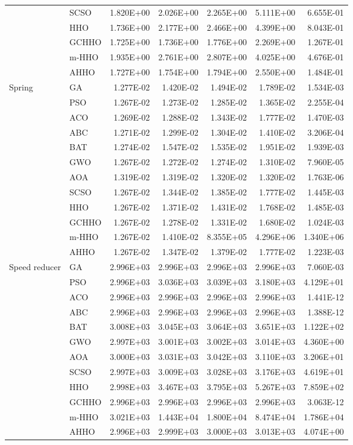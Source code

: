 \begin{longtable}{llrrrrr}
 & SCSO & 1.820E+00 & 2.026E+00 & 2.265E+00 & 5.111E+00 & 6.655E-01 \\
 & HHO & 1.736E+00 & 2.177E+00 & 2.466E+00 & 4.399E+00 & 8.043E-01 \\
 & GCHHO & 1.725E+00 & 1.736E+00 & 1.776E+00 & 2.269E+00 & 1.267E-01 \\
 & m-HHO & 1.935E+00 & 2.761E+00 & 2.807E+00 & 4.025E+00 & 4.676E-01 \\
 & AHHO & 1.727E+00 & 1.754E+00 & 1.794E+00 & 2.550E+00 & 1.484E-01 \\
\addlinespace
Spring & GA & 1.277E-02 & 1.420E-02 & 1.494E-02 & 1.789E-02 & 1.534E-03 \\
 & PSO & 1.267E-02 & 1.273E-02 & 1.285E-02 & 1.365E-02 & 2.255E-04 \\
 & ACO & 1.269E-02 & 1.288E-02 & 1.343E-02 & 1.777E-02 & 1.470E-03 \\
 & ABC & 1.271E-02 & 1.299E-02 & 1.304E-02 & 1.410E-02 & 3.206E-04 \\
 & BAT & 1.274E-02 & 1.547E-02 & 1.535E-02 & 1.951E-02 & 1.939E-03 \\
 & GWO & 1.267E-02 & 1.272E-02 & 1.274E-02 & 1.310E-02 & 7.960E-05 \\
 & AOA & 1.319E-02 & 1.319E-02 & 1.320E-02 & 1.320E-02 & 1.763E-06 \\
 & SCSO & 1.267E-02 & 1.344E-02 & 1.385E-02 & 1.777E-02 & 1.445E-03 \\
 & HHO & 1.267E-02 & 1.371E-02 & 1.431E-02 & 1.768E-02 & 1.485E-03 \\
 & GCHHO & 1.267E-02 & 1.278E-02 & 1.331E-02 & 1.680E-02 & 1.024E-03 \\
 & m-HHO & 1.267E-02 & 1.410E-02 & 8.355E+05 & 4.296E+06 & 1.340E+06 \\
 & AHHO & 1.267E-02 & 1.347E-02 & 1.379E-02 & 1.777E-02 & 1.223E-03 \\
\addlinespace
Speed reducer & GA & 2.996E+03 & 2.996E+03 & 2.996E+03 & 2.996E+03 & 7.060E-03 \\
 & PSO & 2.996E+03 & 3.036E+03 & 3.039E+03 & 3.180E+03 & 4.129E+01 \\
 & ACO & 2.996E+03 & 2.996E+03 & 2.996E+03 & 2.996E+03 & 1.441E-12 \\
 & ABC & 2.996E+03 & 2.996E+03 & 2.996E+03 & 2.996E+03 & 1.388E-12 \\
 & BAT & 3.008E+03 & 3.045E+03 & 3.064E+03 & 3.651E+03 & 1.122E+02 \\
 & GWO & 2.997E+03 & 3.001E+03 & 3.002E+03 & 3.014E+03 & 4.360E+00 \\
 & AOA & 3.000E+03 & 3.031E+03 & 3.042E+03 & 3.110E+03 & 3.206E+01 \\
 & SCSO & 2.997E+03 & 3.009E+03 & 3.028E+03 & 3.176E+03 & 4.619E+01 \\
 & HHO & 2.998E+03 & 3.467E+03 & 3.795E+03 & 5.267E+03 & 7.859E+02 \\
 & GCHHO & 2.996E+03 & 2.996E+03 & 2.996E+03 & 2.996E+03 & 3.063E-12 \\
 & m-HHO & 3.021E+03 & 1.443E+04 & 1.800E+04 & 8.474E+04 & 1.786E+04 \\
 & AHHO & 2.996E+03 & 2.999E+03 & 3.000E+03 & 3.013E+03 & 4.074E+00 \\
\end{longtable}
